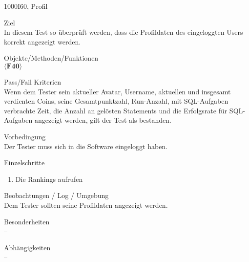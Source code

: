 \newpage
\begin{testcase}{1000}{I60, Profil}
\label{T1000}
\item[Ziel]~\\
In diesem Test so überprüft werden, dass die Profildaten des eingeloggten Users korrekt angezeigt werden.
\item[Objekte/Methoden/Funktionen]~\\
$\langle\textbf{F40}\rangle$
\item[Pass/Fail Kriterien]~\\
Wenn dem Tester sein aktueller Avatar, Username, aktuellen und insgesamt verdienten Coins, seine Gesamtpunktzahl, Run-Anzahl, mit SQL-Aufgaben verbrachte Zeit, die Anzahl an gelösten Statements und die Erfolgsrate für SQL-Aufgaben angezeigt werden, gilt der Test als bestanden.
\item[Vorbedingung]~\\
Der Tester muss sich in die Software eingeloggt haben. 
\item[Einzelschritte]~\\
\begin{enumerate}
	\item Die Rankings aufrufen\\

\end{enumerate}
\item[Beobachtungen / Log / Umgebung]~\\ 
Dem Tester sollten seine Profildaten angezeigt werden.
\item[Besonderheiten]~\\
--
\item[Abhängigkeiten]~\\
--
\end{testcase}


